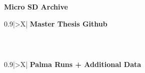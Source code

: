 \begin{titlepage}
\centering
\vspace*{2cm}

{\Huge \textbf{Micro SD Archive}}\\[2cm]

\renewcommand{\arraystretch}{1.8} %
\noindent
\begin{tabularx}{0.9\textwidth}{|>{\centering\arraybackslash}X|}
\hline
\textbf{Master Thesis Github}\\[-0.2cm] %
\begin{tabular}{|p{3.5cm}|p{3.5cm}|}
\hline
\vspace{1.5cm} & \vspace{1.5cm} \\ %
\hline
\end{tabular}
\vspace{0.3cm} %
\\[0.3cm]
\hline
\end{tabularx}

\vspace{3cm}

\noindent
\begin{tabularx}{0.9\textwidth}{|>{\centering\arraybackslash}X|}
\hline
\textbf{Palma Runs + Additional Data}\\[-0.2cm] %
\begin{tabular}{|p{3.5cm}|p{3.5cm}|}
\hline
\vspace{1.5cm} & \vspace{1.5cm} \\ %
\hline
\end{tabular}
\vspace{0.3cm} %
\\[0.3cm]
\hline
\end{tabularx}

\vfill
\end{titlepage}
